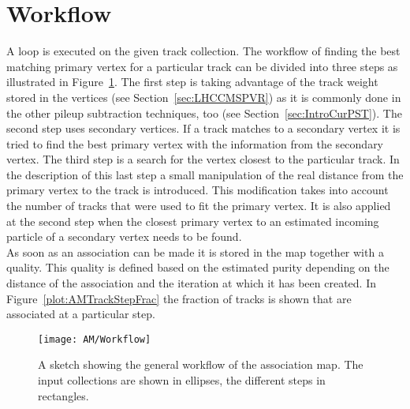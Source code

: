 \section{Workflow \label{sec:AMWorkflow}}

A loop is executed on the given track collection. The workflow of finding the best matching primary vertex for a particular track can be divided into three steps as illustrated in Figure~\ref{plot:AMWorkSketch}. The first step is taking advantage of the track weight stored in the vertices (see Section~\ref{sec:LHCCMSPVR}) as it is commonly done in the other pileup subtraction techniques, too (see Section~\ref{sec:IntroCurPST}). The second step uses secondary vertices. If a track matches to a secondary vertex it is tried to find the best primary vertex with the information from the secondary vertex. The third step is a search for the vertex closest to the particular track. In the description of this last step a small manipulation of the real distance from the primary vertex to the track is introduced. This modification takes into account the number of tracks that were used to fit the primary vertex. It is also applied at the second step when the closest primary vertex to an estimated incoming particle of a secondary vertex needs to be found. \\
As soon as an association can be made it is stored in the map together with a quality. This quality is defined based on the estimated purity depending on the distance of the association and the iteration at which it has been created. In Figure~\ref{plot:AMTrackStepFrac} the fraction of tracks is shown that are associated at a particular step.

\begin{figure}[!ht]
  \centering
  \texttt{[image: AM/Workflow]}
  \caption[Sketch of the workflow of the association map]{A sketch showing the general workflow of the association map. The input collections are shown in ellipses, the different steps in rectangles. \label{plot:AMWorkSketch}}
\end{figure}

